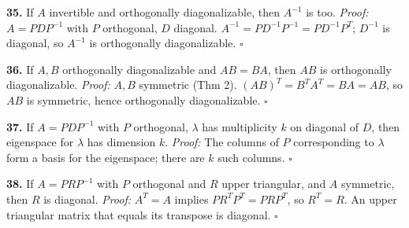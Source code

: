 \begin{solution}
\textbf{35.} If $A$ invertible and orthogonally diagonalizable, then $A^{-1}$ is too. \textit{Proof:} $A=PDP^{-1}$ with $P$ orthogonal, $D$ diagonal. $A^{-1}=PD^{-1}P^{-1}=PD^{-1}P^T$; $D^{-1}$ is diagonal, so $A^{-1}$ is orthogonally diagonalizable. $\square$

\textbf{36.} If $A,B$ orthogonally diagonalizable and $AB=BA$, then $AB$ is orthogonally diagonalizable. \textit{Proof:} $A,B$ symmetric (Thm 2). $(AB)^T=B^TA^T=BA=AB$, so $AB$ is symmetric, hence orthogonally diagonalizable. $\square$

\textbf{37.} If $A=PDP^{-1}$ with $P$ orthogonal, $\lambda$ has multiplicity $k$ on diagonal of $D$, then eigenspace for $\lambda$ has dimension $k$. \textit{Proof:} The columns of $P$ corresponding to $\lambda$ form a basis for the eigenspace; there are $k$ such columns. $\square$

\textbf{38.} If $A=PRP^{-1}$ with $P$ orthogonal and $R$ upper triangular, and $A$ symmetric, then $R$ is diagonal. \textit{Proof:} $A^T=A$ implies $PR^TP^T=PRP^T$, so $R^T=R$. An upper triangular matrix that equals its transpose is diagonal. $\square$
\end{solution}
